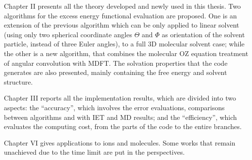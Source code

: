 Chapter II presents all the theory developed and newly used in this
thesis. Two algorithms for the excess energy functional evaluation
are proposed. One is an extension of the previous algorithm which
can be only applied to linear solvent (using only two spherical coordinate
angles $\Theta$ and $\Phi$ as orientation of the solvent particle,
instead of three Euler angles), to a full 3D molecular solvent case;
while the other is a new algorithm, that combines the molecular \acs{OZ}
equation treatment of angular convolution with \acs{MDFT}. The solvation
properties that the code generates are also presented, mainly containing
the free energy and solvent structure.

Chapter III reports all the implementation results, which are divided
into two aspects: the ``accuracy'', which involves the error evaluations,
comparisons between algorithms and with \acs{IET} and \acs{MD} results;
and the ``efficiency'', which evaluates the computing cost, from
the parts of the code to the entire branches.

Chapter VI gives applications to ions and molecules. Some works that
remain unachieved due to the time limit are put in the perspectives.
